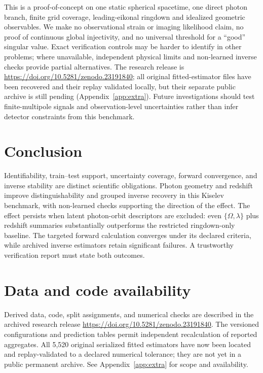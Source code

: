 \documentclass{article}
\begin{document}
This is a proof-of-concept on one static spherical spacetime, one direct photon branch, finite grid coverage, leading-eikonal ringdown and idealized geometric observables. We make no observational strain or imaging likelihood claim, no proof of continuous global injectivity, and no universal threshold for a ``good'' singular value. Exact verification controls may be harder to identify in other problems; where unavailable, independent physical limits and non-learned inverse checks provide partial alternatives. The research release is \url{https://doi.org/10.5281/zenodo.23191840}; all original fitted-estimator files have been recovered and their replay validated locally, but their separate public archive is still pending (Appendix~\ref{app:extra}). Future investigations should test finite-multipole signals and observation-level uncertainties rather than infer detector constraints from this benchmark.

\section{Conclusion}
Identifiability, train--test support, uncertainty coverage, forward convergence, and inverse stability are distinct scientific obligations. Photon geometry and redshift improve distinguishability and grouped inverse recovery in this Kiselev benchmark, with non-learned checks supporting the direction of the effect. The effect persists when latent photon-orbit descriptors are excluded: even $\{\Omega,\lambda\}$ plus redshift summaries substantially outperforms the restricted ringdown-only baseline. The targeted forward calculation converges under its declared criteria, while archived inverse estimators retain significant failures. A trustworthy verification report must state both outcomes.

\section*{Data and code availability}
Derived data, code, split assignments, and numerical checks are described in the archived research release \url{https://doi.org/10.5281/zenodo.23191840}. The versioned configurations and prediction tables permit independent recalculation of reported aggregates. All 5,520 original serialized fitted estimators have now been located and replay-validated to a declared numerical tolerance; they are not yet in a public permanent archive. See Appendix~\ref{app:extra} for scope and availability.
\end{document}
